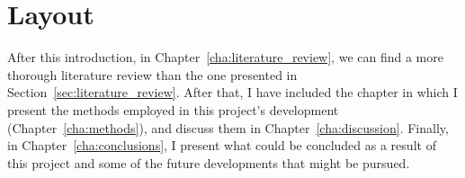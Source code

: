 

\section{Layout}%
\label{sec:layout}

After this introduction, in Chapter~\ref{cha:literature_review}, we can
find a more thorough literature review than the one presented in
Section~\ref{sec:literature_review}. After that, I have included the
chapter in which I present the methods employed in this project's
development (Chapter~\ref{cha:methods}), and discuss them in
Chapter~\ref{cha:discussion}. Finally, in Chapter~\ref{cha:conclusions},
I present what could be concluded as a result of this project and some
of the future developments that might be pursued.
